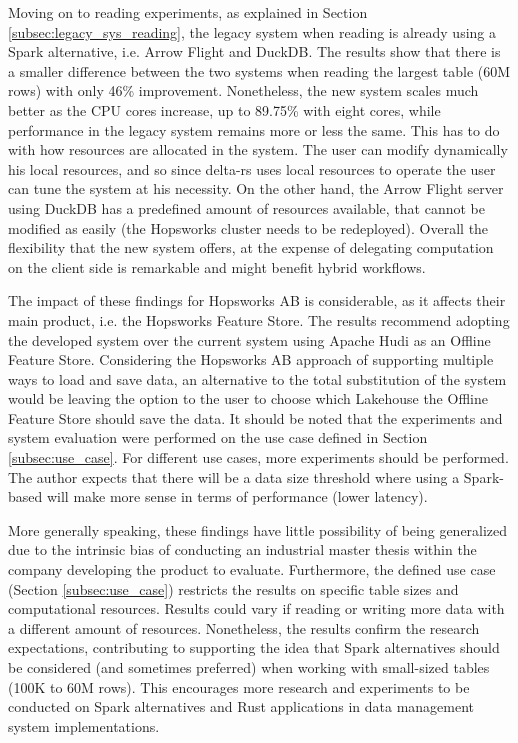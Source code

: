 Moving on to reading experiments, as explained in Section \ref{subsec:legacy_sys_reading}, the legacy system when reading is already using a Spark alternative, i.e. Arrow Flight and DuckDB. The results show that there is a smaller difference between the two systems when reading the largest table (60M rows) with only 46\% improvement. Nonetheless, the new system scales much better as the \gls{CPU} cores increase, up to 89.75\% with eight cores, while performance in the legacy system remains more or less the same. This has to do with how resources are allocated in the system. The user can modify dynamically his local resources, and so since delta-rs uses local resources to operate the user can tune the system at his necessity. On the other hand, the Arrow Flight server using DuckDB has a predefined amount of resources available, that cannot be modified as easily (the Hopsworks cluster needs to be redeployed). Overall the flexibility that the new system offers, at the expense of delegating computation on the client side is remarkable and might benefit hybrid workflows.

The impact of these findings for Hopsworks \gls{AB} is considerable, as it affects their main product, i.e. the Hopsworks Feature Store. The results recommend adopting the developed system over the current system using Apache Hudi as an Offline Feature Store. Considering the Hopsworks \gls{AB} approach of supporting multiple ways to load and save data, an alternative to the total substitution of the system would be leaving the option to the user to choose which Lakehouse the Offline Feature Store should save the data. It should be noted that the experiments and system evaluation were performed on the use case defined in Section \ref{subsec:use_case}. For different use cases, more experiments should be performed. The author expects that there will be a data size threshold where using a Spark-based will make more sense in terms of performance (lower latency).

More generally speaking, these findings have little possibility of being generalized due to the intrinsic bias of conducting an industrial master thesis within the company developing the product to evaluate. Furthermore, the defined use case (Section \ref{subsec:use_case}) restricts the results on specific table sizes and computational resources. Results could vary if reading or writing more data with a different amount of resources. Nonetheless, the results confirm the research expectations, contributing to supporting the idea that Spark alternatives should be considered (and sometimes preferred) when working with small-sized tables (100K to 60M rows). This encourages more research and experiments to be conducted on Spark alternatives and Rust applications in data management system implementations. 

